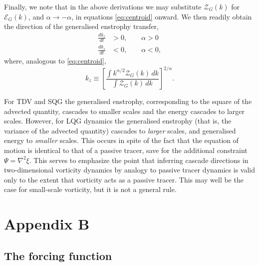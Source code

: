 \documentclass{jfm}
\newcommand{\ca}  [1]{\mathcal{#1}}
\newcommand{\del} {\nabla}
\begin{document}
Finally, we note that in the above derivations we may substitute
$\ca{Z}_G(k)$ for $\ca{E}_G(k)$, and $\alpha \rightarrow -\alpha$, in
equations \eqref{eq:centroid} onward. We then readily obtain the
direction of the generalised enstrophy transfer,
\begin{equation}
\begin{aligned}
\label{eq:direcz}
 \frac{d k_z}{dt} & > 0, \qquad \alpha > 0 \\
 \frac{d k_z}{dt} & < 0, \qquad \alpha < 0,
\end{aligned}
\end{equation}
where, analogous to \eqref{eq:centroid},
\begin{equation}
k_z \equiv \left[\frac{\int k^{\alpha/2} \ca{Z}_G(k)\, dk}
{\int \ca{Z}_G(k) \,dk}\right]^{2/\alpha} .
\end{equation}

For TDV and SQG the generalised enstrophy, corresponding to the square
of the advected quantity, cascades to smaller scales and the energy
cascades to larger scales. However, for LQG dynamics the generalised
enstrophy (that is, the variance of the advected quantity) cascades to
\emph{larger} scales, and generalised energy to \emph{smaller}
scales. This occurs in spite of the fact that the equation of motion
is identical to that of a passive tracer, save for the additional
constraint $\Psi = \del^2 \xi$. This serves to emphasize the point
that inferring cascade directions in two-dimensional vorticity
dynamics by analogy to passive tracer dynamics is valid only to the
extent that vorticity acts as a passive tracer. This may well be the
case for small-scale vorticity, but it is not a general rule.

\appendix
        \addtocounter{section}{2}

\section*{Appendix B}
\subsection*{The forcing function}
\end{document}
